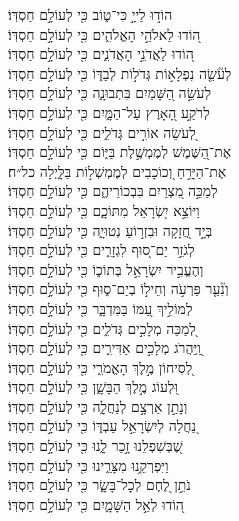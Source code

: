 {	
	הוֹד֣וּ לַייָ֣ כִּי־ט֑וֹב \hfill
	כִּ֖י לְעוֹלָ֣ם חַסְדּֽוֹ׃\\
	ה֭וֹדוּ לֵאלֹהֵ֣י הָאֱלֹהִ֑ים \hfill כִּ֖י לְעוֹלָ֣ם חַסְדּֽוֹ׃\\
	ה֭וֹדוּ לַאֲדֹנֵ֣י הָאֲדֹנִ֑ים \hfill כִּ֖י לְעוֹלָ֣ם חַסְדּֽוֹ׃\\
	לְעֹ֘שֵׂ֤ה נִפְלָא֣וֹת גְּדֹל֣וֹת לְבַדּ֑וֹ \hfill כִּ֖י לְעוֹלָ֣ם חַסְדּֽוֹ׃\\
	לְעֹשֵׂ֣ה הַ֭שָּׁמַיִם בִּתְבוּנָ֑ה \hfill כִּ֖י לְעוֹלָ֣ם חַסְדּֽוֹ׃\\
	לְרֹקַ֣ע הָ֭אָרֶץ עַל־הַמָּ֑יִם \hfill כִּ֖י לְעוֹלָ֣ם חַסְדּֽוֹ׃\\
	לְ֭עֹשֵׂה אוֹרִ֣ים גְּדֹלִ֑ים \hfill כִּ֖י לְעוֹלָ֣ם חַסְדּֽוֹ׃\\
	אֶת־הַ֭שֶּׁמֶשׁ לְמֶמְשֶׁ֣לֶת בַּיּ֑וֹם \hfill כִּ֖י לְעוֹלָ֣ם חַסְדּֽוֹ׃\\
	אֶת־הַיָּרֵ֣חַ וְ֭כוֹכָבִים לְמֶמְשְׁל֣וֹת בַּלָּ֑יְלָה \hfill כל״ח׃\\
	לְמַכֵּ֣ה מִ֭צְרַיִם בִּבְכוֹרֵיהֶ֑ם \hfill כִּ֖י לְעוֹלָ֣ם חַסְדּֽוֹ׃\\
	וַיּוֹצֵ֣א יִ֭שְׂרָאֵל מִתּוֹכָ֑ם \hfill כִּ֖י לְעוֹלָ֣ם חַסְדּֽוֹ׃\\
	בְּיָ֣ד חֲ֭זָקָה וּבִזְר֣וֹעַ נְטוּיָ֑ה \hfill כִּ֖י לְעוֹלָ֣ם חַסְדּֽוֹ׃\\
	לְגֹזֵ֣ר יַם־ס֭וּף לִגְזָרִ֑ים \hfill כִּ֖י לְעוֹלָ֣ם חַסְדּֽוֹ׃\\
	וְהֶעֱבִ֣יר יִשְׂרָאֵ֣ל בְּתוֹכ֑וֹ \hfill כִּ֖י לְעוֹלָ֣ם חַסְדּֽוֹ׃\\
	וְנִ֘עֵ֤ר פַּרְעֹ֣ה וְחֵיל֣וֹ בְיַם־ס֑וּף \hfill כִּ֖י לְעוֹלָ֣ם חַסְדּֽוֹ׃\\
	לְמוֹלִ֣יךְ עַ֭מּוֹ בַּמִּדְבָּ֑ר \hfill כִּ֖י לְעוֹלָ֣ם חַסְדּֽוֹ׃\\
	לְ֭מַכֵּה מְלָכִ֣ים גְּדֹלִ֑ים \hfill כִּ֖י לְעוֹלָ֣ם חַסְדּֽוֹ׃\\
	וַֽ֭יַּהֲרֹג מְלָכִ֣ים אַדִּירִ֑ים \hfill כִּ֖י לְעוֹלָ֣ם חַסְדּֽוֹ׃\\
	לְ֭סִיחוֹן מֶ֣לֶךְ הָאֱמֹרִ֑י \hfill כִּ֖י לְעוֹלָ֣ם חַסְדּֽוֹ׃\\
	וּ֭לְעוֹג מֶ֣לֶךְ הַבָּשָׁ֑ן \hfill כִּ֖י לְעוֹלָ֣ם חַסְדּֽוֹ׃\\
	וְנָתַ֣ן אַרְצָ֣ם לְנַחֲלָ֑ה \hfill כִּ֖י לְעוֹלָ֣ם חַסְדּֽוֹ׃\\
	נַ֭חֲלָה לְיִשְׂרָאֵ֣ל עַבְדּ֑וֹ \hfill כִּ֖י לְעוֹלָ֣ם חַסְדּֽוֹ׃\\
	שֶׁ֭בְּשִׁפְלֵנוּ זָ֣כַר לָ֑נוּ \hfill כִּ֖י לְעוֹלָ֣ם חַסְדּֽוֹ׃\\
	וַיִּפְרְקֵ֥נוּ מִצָּרֵ֑ינוּ \hfill כִּ֖י לְעוֹלָ֣ם חַסְדּֽוֹ׃\\
	נֹתֵ֣ן לֶ֭חֶם לְכׇל־בָּשָׂ֑ר \hfill כִּ֖י לְעוֹלָ֣ם חַסְדּֽוֹ׃\\
	ה֭וֹדוּ לְאֵ֣ל הַשָּׁמָ֑יִם \hfill כִּ֖י לְעוֹלָ֣ם חַסְדּֽוֹ׃\\
	
}
